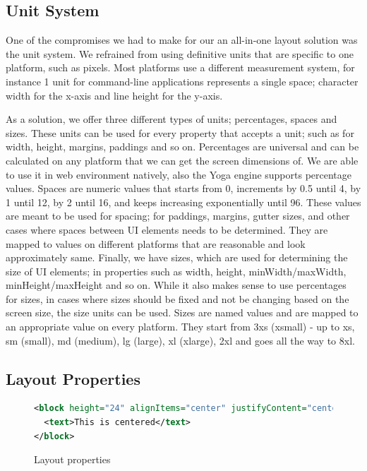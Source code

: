 \subsection{Unit System}

One of the compromises we had to make for our an all-in-one layout solution was the unit system. We refrained from using definitive units that are specific to one platform, such as pixels. Most platforms use a different measurement system, for instance 1 unit for command-line applications represents a single space; character width for the x-axis and line height for the y-axis.

As a solution, we offer three different types of units; percentages, spaces and sizes. These units can be used for every property that accepts a unit; such as for width, height, margins, paddings and so on. Percentages are universal and can be calculated on any platform that we can get the screen dimensions of. We are able to use it in web environment natively, also the Yoga engine supports percentage values. Spaces are numeric values that starts from 0, increments by 0.5 until 4, by 1 until 12, by 2 until 16, and keeps increasing exponentially until 96. These values are meant to be used for spacing; for paddings, margins, gutter sizes, and other cases where spaces between UI elements needs to be determined. They are mapped to values on different platforms that are reasonable and look approximately same. Finally, we have sizes, which are used for determining the size of UI elements; in properties such as width, height, minWidth/maxWidth, minHeight/maxHeight and so on. While it also makes sense to use percentages for sizes, in cases where sizes should be fixed and not be changing based on the screen size, the size units can be used. Sizes are named values and are mapped to an appropriate value on every platform. They start from 3xs (xsmall) - up to xs, sm (small), md (medium), lg (large), xl (xlarge), 2xl and goes all the way to 8xl.

\subsection{Layout Properties}

\begin{figure}[H]
\begin{minipage}{\linewidth}
\begin{lstlisting}[language=xml]
<block height="24" alignItems="center" justifyContent="center">
  <text>This is centered</text>
</block>
\end{lstlisting}
\end{minipage}
\caption{Layout properties}%
\label{fig:layout_props_example}%
\end{figure}

